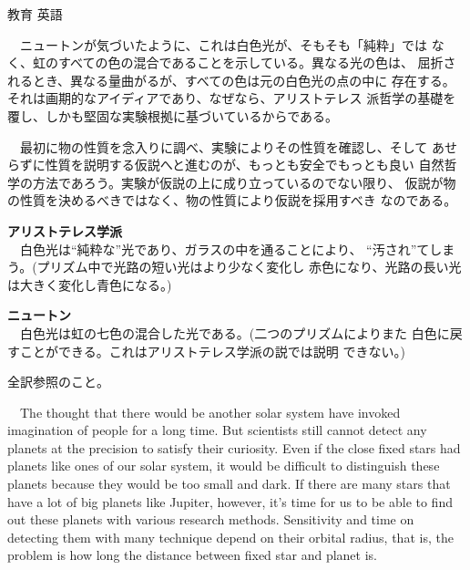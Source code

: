 \documentclass[fleqn]{jbook}
\begin{document}
\begin{answer}{教育 英語}{}
\begin{subanswers}
  　ニュートンが気づいたように、これは白色光が、そもそも「純粋」では
  なく、虹のすべての色の混合であることを示している。異なる光の色は、
  屈折されるとき、異なる量曲がるが、すべての色は元の白色光の点の中に
  存在する。それは画期的なアイディアであり、なぜなら、アリストテレス
  派哲学の基礎を覆し、しかも堅固な実験根拠に基づいているからである。

  　最初に物の性質を念入りに調べ、実験によりその性質を確認し、そして
  あせらずに性質を説明する仮説へと進むのが、もっとも安全でもっとも良い
  自然哲学の方法であろう。実験が仮説の上に成り立っているのでない限り、
  仮説が物の性質を決めるべきではなく、物の性質により仮説を採用すべき
  なのである。

  \begin{subsubanswers}
  \SubSubAnswer
    {\bf アリストテレス学派}\\
    　白色光は``純粋な''光であり、ガラスの中を通ることにより、
    ``汚され''てしまう。(プリズム中で光路の短い光はより少なく変化し
    赤色になり、光路の長い光は大きく変化し青色になる。)

    {\bf ニュートン}\\
    　白色光は虹の七色の混合した光である。(二つのプリズムによりまた
    白色に戻すことができる。これはアリストテレス学派の説では説明
    できない。)

  \SubSubAnswer
    全訳参照のこと。

  \end{subsubanswers}

\SubAnswer
\baselineskip=12pt
  　The thought that there would be another solar system have invoked
  imagination of people for a long time. But scientists still cannot
  detect any planets at the precision to satisfy their curiosity.
  Even if the close fixed stars had planets like ones of our solar
  system, it would be difficult to distinguish these planets because
  they would be too small and dark. If there are many stars that have
  a lot of big planets like Jupiter, however, it's time for us to be
  able to find out these planets with various research methods.
  Sensitivity and time on detecting them with many technique depend
  on their orbital radius, that is, the problem is how long the
  distance between fixed star and planet is.
\baselineskip=15pt

\end{subanswers}
\end{answer}
\end{document}
